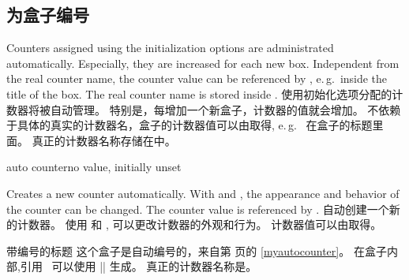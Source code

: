 \subsection{为盒子编号}\label{sec:numberedboxes}
\begin{stripedbox}
Counters assigned using the initialization options are administrated automatically.
Especially, they are increased for each new box.
Independent from the real counter name, 
the counter value can be referenced by , e.\,g.\ 
inside the title of the box. 
The real counter name is stored inside .
\tcblower
使用初始化选项分配的计数器将被自动管理。%
特别是，每增加一个新盒子，计数器的值就会增加。%
不依赖于具体的真实的计数器名，盒子的计数器值可以由取得, e.\,g.\ %
在盒子的标题里面。%
真正的计数器名称存储在中。
\end{stripedbox}


\begin{newTcbKey}{auto counter}{}{no value, initially unset}
\begin{stripedbox}
Creates a new counter automatically.%
With  and , 
the appearance and behavior of the counter can be changed. 
The counter value is referenced by .
\tcblower
自动创建一个新的计数器。%
使用  和 , %
可以更改计数器的外观和行为。%
计数器值可以由取得。
\end{stripedbox}



\begin{dispExample}
\begin{pabox}[label={myautocounter}]{带编号的标题}
这个盒子是自动编号的，来自第 \pageref{myautocounter} 页的 \ref{myautocounter}。%
在盒子内部,引用 \thetcbcounter\ 可以使用 |\thetcbcounter| 生成。
真正的计数器名称是\texttt{\tcbcounter}。
\end{pabox}
\end{dispExample}
\end{newTcbKey}


